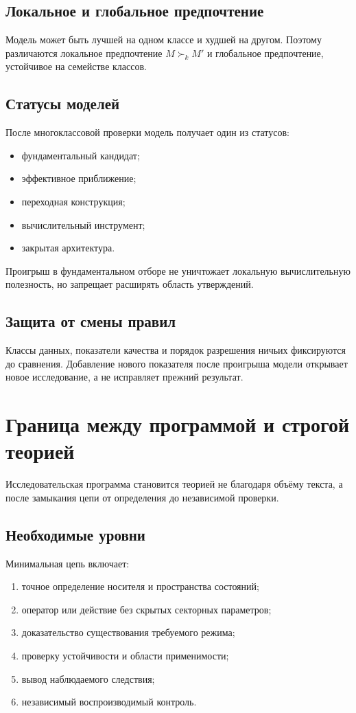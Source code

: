 \section{Локальное и глобальное предпочтение}

Модель может быть лучшей на одном классе и худшей на другом. Поэтому
различаются локальное предпочтение $M\succ_k M'$ и глобальное предпочтение,
устойчивое на семействе классов.

\section{Статусы моделей}

После многоклассовой проверки модель получает один из статусов:
\begin{itemize}
 \item фундаментальный кандидат;
 \item эффективное приближение;
 \item переходная конструкция;
 \item вычислительный инструмент;
 \item закрытая архитектура.
\end{itemize}

Проигрыш в фундаментальном отборе не уничтожает локальную вычислительную
полезность, но запрещает расширять область утверждений.

\section{Защита от смены правил}

Классы данных, показатели качества и порядок разрешения ничьих фиксируются до
сравнения. Добавление нового показателя после проигрыша модели открывает новое
исследование, а не исправляет прежний результат.

\chapter{Граница между программой и строгой теорией}

Исследовательская программа становится теорией не благодаря объёму текста, а
после замыкания цепи от определения до независимой проверки.

\section{Необходимые уровни}

Минимальная цепь включает:
\begin{enumerate}
 \item точное определение носителя и пространства состояний;
 \item оператор или действие без скрытых секторных параметров;
 \item доказательство существования требуемого режима;
 \item проверку устойчивости и области применимости;
 \item вывод наблюдаемого следствия;
 \item независимый воспроизводимый контроль.
\end{enumerate}

